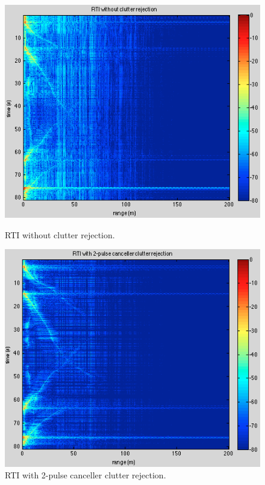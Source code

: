 \documentclass{article}
\begin{document}
\begin{figure}[ht]
\begin{minipage}[b]{0.33\linewidth}
\centering
\includegraphics[width=\textwidth]{Figures/no_rejection.png}
\caption{RTI without clutter rejection.}
\label{fig:no_rejection}
\end{minipage}
\begin{minipage}[b]{0.33\linewidth}
\centering
\includegraphics[width=\textwidth]{Figures/rejection.png}
\caption{RTI with 2-pulse canceller clutter rejection.}
\label{fig:rejection}

\end{minipage}
\end{figure}
\end{document}
